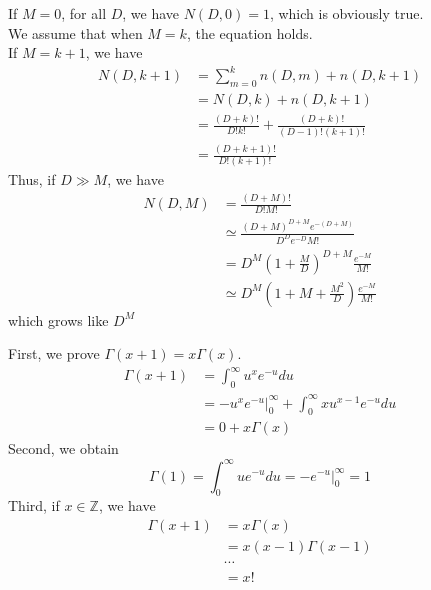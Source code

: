 \documentclass[12pt]{article}
\newenvironment{exercise}[2][Ex]{\begin{trivlist}
\item[\hskip \labelsep {\bfseries #1}\hskip \labelsep {\bfseries #2.}]}{\end{trivlist}}
\begin{document}
\begin{exercise}{1.16(***)}
    If $M=0$, for all $D$, we have $N(D,0)=1$, which is obviously true.\\
    We assume that when $M=k$, the equation holds.\\
    If $M=k+1$, we have
    \begin{align*}
        N(D,k+1)&=\sum_{m=0}^kn(D,m)+n(D,k+1)\\
        &=N(D,k)+n(D,k+1)\\
        &=\frac{(D+k)!}{D!k!}+\frac{(D+k)!}{(D-1)!(k+1)!}\\
        &=\frac{(D+k+1)!}{D!(k+1)!}
    \end{align*}
    Thus, if $D\gg M$, we have
    \begin{align*}
        N(D,M)&=\frac{(D+M)!}{D!M!}\\
        &\simeq \frac{(D+M)^{D+M}e^{-(D+M)}}{D^De^{-D}M!}\\
        &=D^M(1+\frac{M}{D})^{D+M}\frac{e^{-M}}{M!}\\
        &\simeq D^M(1+M+\frac{M^2}{D})\frac{e^{-M}}{M!}
    \end{align*}
    which grows like $D^M$
\end{exercise}
\begin{exercise}{1.17(**)}
    First, we prove $\Gamma(x+1)=x\Gamma(x)$.
    \begin{align*}
        \Gamma(x+1)&=\int_0^\infty u^xe^{-u}du\\
        &=-u^xe^{-u}\Big\vert_0^\infty+\int_0^\infty xu^{x-1}e^{-u}du\\
        &=0+x\Gamma(x)
    \end{align*}
    Second, we obtain
    \[
        \Gamma(1)=\int_0^\infty ue^{-u}du=-e^{-u}\Big\vert_0^\infty=1
        \]
    Third, if $x\in \mathbb{Z}$, we have
    \begin{align*}
        \Gamma(x+1)&=x\Gamma(x)\\
        &=x(x-1)\Gamma(x-1)\\
        &\cdots\\
        &=x!
    \end{align*}
\end{exercise}
\end{document}
